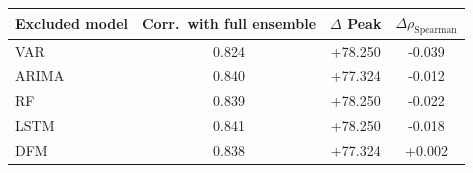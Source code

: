 \begin{tabular}{lccc}
\toprule
Excluded model & Corr.\ with full ensemble & $\Delta$ Peak & $\Delta\rho_{\text{Spearman}}$ \\
\midrule
VAR & 0.824 & +78.250 & -0.039 \\
ARIMA & 0.840 & +77.324 & -0.012 \\
RF & 0.839 & +78.250 & -0.022 \\
LSTM & 0.841 & +78.250 & -0.018 \\
DFM & 0.838 & +77.324 & +0.002 \\
\bottomrule
\end{tabular}

